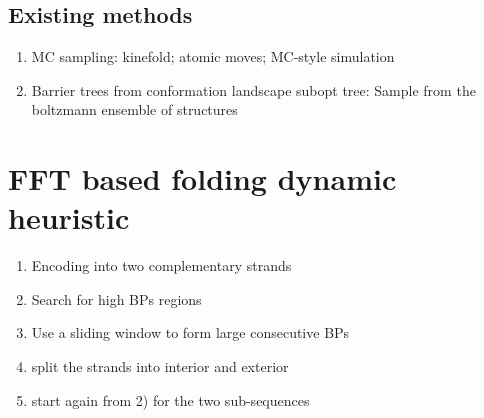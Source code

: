 \documentclass[a4paper,12pt]{article}
\begin{document}
\subsection{Existing methods}
\label{sec:org829134c}
\begin{enumerate}
\item MC sampling: kinefold; atomic moves; MC-style simulation
\item Barrier trees from conformation landscape subopt tree: Sample from the
boltzmann ensemble of structures
\end{enumerate}

\clearpage
\section{FFT based folding dynamic heuristic}
\label{sec:org2c0a75f}
\begin{enumerate}
\item Encoding into two complementary strands
\item Search for high BPs regions
\item Use a sliding window to form large consecutive BPs
\item split the strands into interior and exterior
\item start again from 2) for the two sub-sequences
\end{enumerate}
\end{document}
